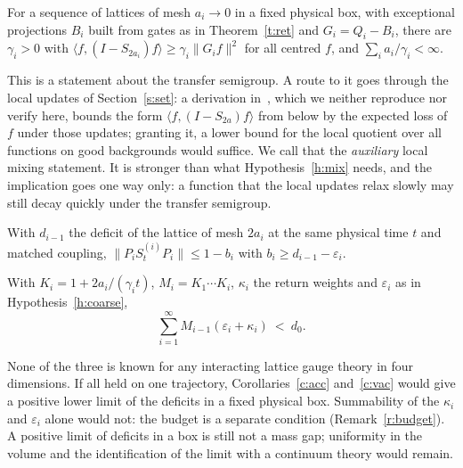 \begin{hypothesis}\label{h:mix}
For a sequence of lattices of mesh $a_i\to0$ in a fixed physical box, with exceptional projections $B_i$ built
from gates as in Theorem~\ref{t:ret} and $G_i=Q_i-B_i$, there are $\gamma_i>0$ with
$\langle f,(I-S_{2a_i})f\rangle\ge\gamma_i\|G_if\|^2$ for all centred $f$, and $\sum_ia_i/\gamma_i<\infty$.
\end{hypothesis}

This is a statement about the transfer semigroup. A route to it goes through the local updates of
Section~\ref{s:set}: a derivation in~\cite{RepoInh}, which we neither reproduce nor verify here, bounds the form
$\langle f,(I-S_{2a})f\rangle$ from below by the expected loss of $f$ under those updates; granting it, a
lower bound for the local quotient over all functions on good backgrounds would suffice. We call that the \emph{auxiliary} local mixing statement. It is stronger
than what Hypothesis~\ref{h:mix} needs, and the implication goes one way only: a function that the local
updates relax slowly may still decay quickly under the transfer semigroup.

\begin{hypothesis}\label{h:coarse}
With $d_{i-1}$ the deficit of the lattice of mesh $2a_i$ at the same physical time $t$ and matched coupling,
$\|P_iS^{(i)}_tP_i\|\le1-b_i$ with $b_i\ge d_{i-1}-\varepsilon_i$.
\end{hypothesis}

\begin{hypothesis}\label{h:budget}
With $K_i=1+2a_i/(\gamma_it)$, $M_i=K_1\cdots K_i$, $\kappa_i$ the return weights and $\varepsilon_i$ as in
Hypothesis~\ref{h:coarse},
\[
\sum_{i=1}^\infty M_{i-1}(\varepsilon_i+\kappa_i)\ <\ d_0 .
\]
\end{hypothesis}

None of the three is known for any interacting lattice gauge theory in four dimensions. If all held on one
trajectory, Corollaries~\ref{c:acc} and~\ref{c:vac} would give a positive lower limit of the deficits in a
fixed physical box. Summability of the $\kappa_i$ and $\varepsilon_i$ alone would not: the budget is a
separate condition (Remark~\ref{r:budget}). A positive limit of deficits in a box is still not a mass gap;
uniformity in the volume and the identification of the limit with a continuum theory would remain.

